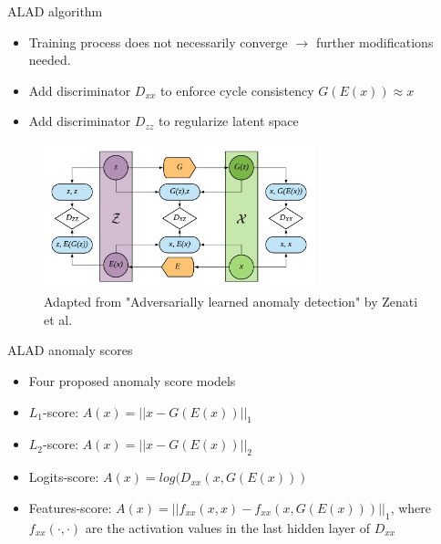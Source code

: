 \documentclass{beamer}
\begin{document}
\begin{frame}{ALAD algorithm}
  \begin{itemize}
      \item<1-> Training process does not necessarily converge $\rightarrow$ further modifications needed.
      \item<2-> Add discriminator $D_{xx}$ to enforce cycle consistency $G(E(x))\approx x$
      \item<3-> Add discriminator $D_{zz}$ to regularize latent space
  \end{itemize}
  \begin{figure}[]
    \begin{center}
    \includegraphics[width=0.7\textwidth]{dladded}
    \caption{Adapted from "Adversarially learned anomaly detection" by Zenati et al.}
    \label{fig:alad}
    \end{center}
  \end{figure}
\end{frame}

\begin{frame}{ALAD anomaly scores}
  \begin{itemize}
      \item<1-> Four proposed anomaly score models
      \item<2-> $L_1$-score: $A(x)=||x-G(E(x))||_{1}$
      \item<3-> $L_2$-score: $A(x)=||x-G(E(x))||_{2}$
      \item<4-> Logits-score: $A(x)=log(D_{xx}(x, G(E(x)))$
      \item<5-> Features-score: $A(x)=||f_{xx}(x,x) - f_{xx}(x, G(E(x)))||_1$, where $f_{xx}(\cdot,\cdot)$ are the activation values in the last hidden layer of $D_{xx}$
  \end{itemize}
\end{frame}
\end{document}
